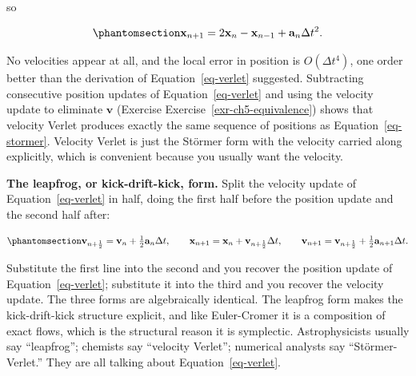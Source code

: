 \documentclass[
  10.5pt,
  letterpaper,
]{scrbook}
\theoremstyle{definition}
\theoremstyle{plain}
\theoremstyle{remark}
\begin{document}
so

\begin{equation}\protect\phantomsection\label{eq-stormer}{
\mathbf{x}_{n+1} = 2\mathbf{x}_n - \mathbf{x}_{n-1} + \mathbf{a}_n\Delta t^2.
}\end{equation}

No velocities appear at all, and the local error in position is
\(O(\Delta t^4)\), one order better than the derivation of
Equation~\ref{eq-verlet} suggested. Subtracting consecutive position
updates of Equation~\ref{eq-verlet} and using the velocity update to
eliminate \(\mathbf{v}\) (Exercise Exercise~\ref{exr-ch5-equivalence})
shows that velocity Verlet produces exactly the same sequence of
positions as Equation~\ref{eq-stormer}. Velocity Verlet is just the
Störmer form with the velocity carried along explicitly, which is
convenient because you usually want the velocity.

\textbf{The leapfrog, or kick-drift-kick, form.} Split the velocity
update of Equation~\ref{eq-verlet} in half, doing the first half before
the position update and the second half after:

\begin{equation}\protect\phantomsection\label{eq-leapfrog}{
\mathbf{v}_{n+\frac12} = \mathbf{v}_n + \tfrac12\mathbf{a}_n\Delta t, \qquad
\mathbf{x}_{n+1} = \mathbf{x}_n + \mathbf{v}_{n+\frac12}\Delta t, \qquad
\mathbf{v}_{n+1} = \mathbf{v}_{n+\frac12} + \tfrac12\mathbf{a}_{n+1}\Delta t.
}\end{equation}

Substitute the first line into the second and you recover the position
update of Equation~\ref{eq-verlet}; substitute it into the third and you
recover the velocity update. The three forms are algebraically
identical. The leapfrog form makes the kick-drift-kick structure
explicit, and like Euler-Cromer it is a composition of exact flows,
which is the structural reason it is symplectic. Astrophysicists usually
say ``leapfrog''; chemists say ``velocity Verlet''; numerical analysts
say ``Störmer-Verlet.'' They are all talking about
Equation~\ref{eq-verlet}.
\end{document}
